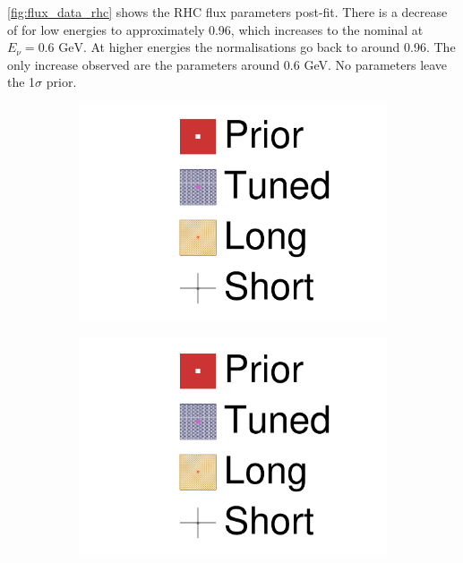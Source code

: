 \autoref{fig:flux_data_rhc} shows the RHC flux parameters post-fit. There is a decrease of \numubar for low energies to approximately 0.96, which increases to the nominal at $E_\nu=0.6\text{ GeV}$. At higher energies the normalisations go back to around 0.96. The only increase observed are the \nuebar parameters around 0.6 GeV. No parameters leave the 1$\sigma$ prior.
\begin{figure}[h]	
	\begin{subfigure}[t]{0.2\textwidth}
		\includegraphics[width=\textwidth, trim={0mm 150mm 50mm 0mm}, clip,page=1]{figures/mach3/data/2017b_NewData_NewDet_UpdXsecStep_2Xsec_4Det_5Flux_0_2017b_June_NewDet_merge_2017b_NewDet_June_Long_0}
	\end{subfigure}
	\begin{subfigure}[t]{0.2\textwidth}
		\includegraphics[width=\textwidth, trim={0mm 100mm 50mm 50mm}, clip,page=1]{figures/mach3/data/2017b_NewData_NewDet_UpdXsecStep_2Xsec_4Det_5Flux_0_2017b_June_NewDet_merge_2017b_NewDet_June_Long_0}

\end{subfigure}
\end{figure}
